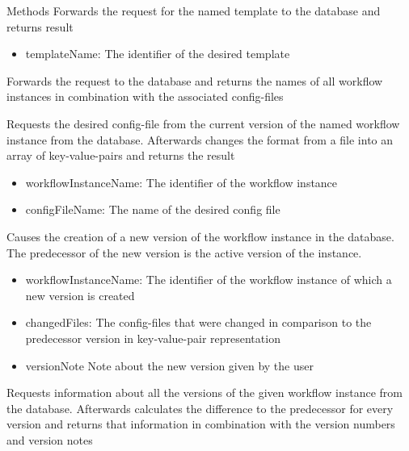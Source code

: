 \begin{methodenv}{Methods}
Forwards the request for the named template to the database and returns result

\begin{itemize}
	\item{templateName:}
	The identifier of the desired template
\end{itemize}

Forwards the request to the database and returns the names of all workflow instances in combination with the associated config-files

Requests the desired config-file from the current version of the named workflow instance from the database. Afterwards changes the format from a file into an array of key-value-pairs and returns the result

\begin{itemize}
	\item{workflowInstanceName:}
	The identifier of the workflow instance
	\item{configFileName:}
	The name of the desired config file
\end{itemize}

Causes the creation of a new version of the workflow instance in the database. The predecessor of the new version is the active version of the instance.

\begin{itemize}
	\item{workflowInstanceName:}
	The identifier of the workflow instance of which a new version is created
	\item{changedFiles:}
	The config-files that were changed in comparison to the predecessor version in key-value-pair representation
	\item{versionNote}
	Note about the new version given by the user
\end{itemize}

Requests information about all the versions of the given workflow instance from the database. Afterwards calculates the difference to the predecessor for every version and returns that information in combination with the version numbers and version notes


\end{methodenv}
